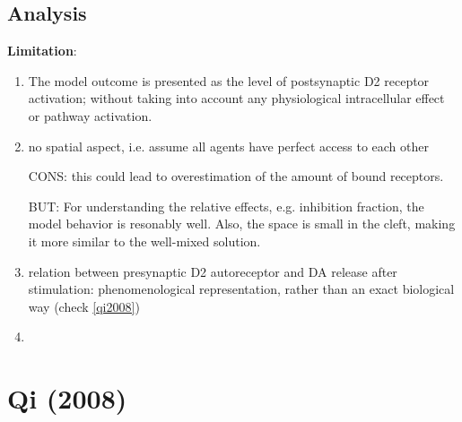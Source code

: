 \subsection{Analysis}

{\bf Limitation}: 
\begin{enumerate}
  \item The model outcome is presented as the level of postsynaptic D2
receptor activation; without taking into account any physiological intracellular
effect or pathway activation.

  \item no spatial aspect, i.e. assume all agents have perfect access to each
  other
  
  CONS: this could lead to overestimation of the amount of bound receptors. 
 
 BUT: For understanding the relative effects, e.g. inhibition fraction, the
 model behavior is resonably well. Also, the space is small in the cleft, making
 it more similar to the well-mixed solution.
  
  \item relation between presynaptic D2 autoreceptor and DA release after
  stimulation: phenomenological representation, rather than an exact biological
  way (check \ref{qi2008})
  
  \item 
\end{enumerate}


\section{Qi (2008)}
\label{sec:Qi-2008}




